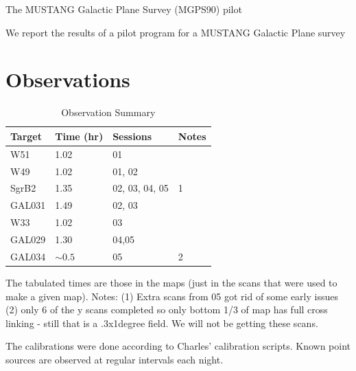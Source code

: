 \documentclass[twocolumn]{aastex62}
\begin{document}
The MUSTANG Galactic Plane Survey (MGPS90) pilot

We report the results of a pilot program for a MUSTANG Galactic Plane survey

\section{Observations}



\begin{table}[htp]
\centering
\caption{Observation Summary}
\begin{tabular}{llll}
    \label{tab:observations}
Target   &      Time (hr) &       Sessions   &   Notes  \\
\hline
W51      &      1.02      &        01        &\\
W49      &      1.02      &        01, 02    &\\
SgrB2    &      1.35      &   02, 03, 04, 05 &   1\\
GAL031   &      1.49      &        02, 03    &\\
W33      &      1.02      &        03        &\\
GAL029   &      1.30      &        04,05     &       \\
GAL034   &     $\sim0.5$  &   05             &   2  \\
\hline
\end{tabular}
\par
The tabulated times are those in the maps (just in the scans that were used to
make a given map).  Notes:
(1) Extra scans from 05 got rid of some early issues
(2) only 6 of the y scans
completed so only bottom 1/3 of map has full cross linking - still that is a
.3x1degree field.  We will not be getting these scans.
\end{table}


The calibrations were done according to Charles' calibration scripts. Known
point sources are observed at regular intervals each night.
\end{document}
